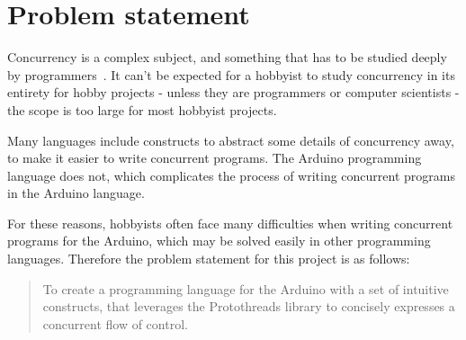 \section{Problem statement}\label{sec:problemstatement}
Concurrency is a complex subject, and something that has to be studied deeply by programmers~\cite{Sebesta2016}. It can't be expected for a hobbyist to study concurrency in its entirety for hobby projects - unless they are programmers or computer scientists - the scope is too large for most hobbyist projects.

Many languages include constructs to abstract some details of concurrency away, to make it easier to write concurrent programs. The Arduino programming language does not, which complicates the process of writing concurrent programs in the Arduino language.

For these reasons, hobbyists often face many difficulties when writing concurrent programs for the Arduino, which may be solved easily in other programming languages. Therefore the problem statement for this project is as follows:

\blockquote{To create a programming language for the Arduino with a set of intuitive constructs, that leverages the Protothreads library to concisely expresses a concurrent flow of control.}








